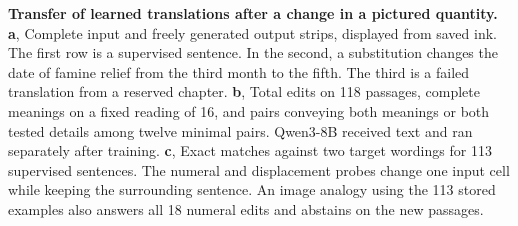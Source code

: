 \textbf{Transfer of learned translations after a change in a pictured quantity.}
\textbf{a}, Complete input and freely generated output strips, displayed from saved ink. The first row is a supervised sentence. In the second, a substitution changes the date of famine relief from the third month to the fifth. The third is a failed translation from a reserved chapter. \textbf{b}, Total edits on 118 passages, complete meanings on a fixed reading of 16, and pairs conveying both meanings or both tested details among twelve minimal pairs. Qwen3-8B received text and ran separately after training. \textbf{c}, Exact matches against two target wordings for 113 supervised sentences. The numeral and displacement probes change one input cell while keeping the surrounding sentence. An image analogy using the 113 stored examples also answers all 18 numeral edits and abstains on the new passages.

